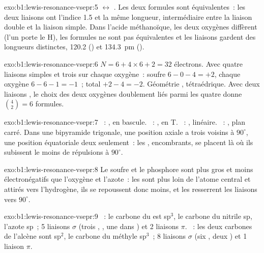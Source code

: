 \begin{solution}{exo:b1:lewis-resonance-vsepr:5}
$\leftrightarrow$
.
Les deux formules sont équivalentes~: les deux liaisons  ont
l'indice 1.5 et la même longueur, intermédiaire entre la liaison double
et la liaison simple. Dans l'acide méthanoïque, les deux oxygènes
diffèrent (l'un porte le H), les formules ne sont pas équivalentes et
les liaisons gardent des longueurs distinctes, 120.2 () et
\qty{134.3}{pm} ().
\end{solution}

\begin{solution}{exo:b1:lewis-resonance-vsepr:6}
$N = 6 + 4 \times 6 + 2 = 32$ électrons. Avec quatre liaisons simples et
trois  sur chaque oxygène~: soufre $6 - 0 - 4 = +2$,
chaque oxygène $6 - 6 - 1 = -1$~; total $+2 - 4 = -2$. Géométrie
, tétraédrique. Avec deux liaisons , le choix des deux
oxygènes doublement liés parmi les quatre donne $\binom{4}{2} = 6$ formules.
\end{solution}

\begin{solution}{exo:b1:lewis-resonance-vsepr:7}
~: , en bascule. ~: , en T.
~: , linéaire. ~: , plan carré.
Dans une bipyramide trigonale, une position axiale a trois voisins à
$90^\circ$, une position équatoriale deux seulement~: les , encombrants, se placent là où ils subissent le moins de
répulsions à $90^\circ$.
\end{solution}

\begin{solution}{exo:b1:lewis-resonance-vsepr:8}
Le soufre et le phosphore sont plus gros et moins électronégatifs que
l'oxygène et l'azote~: les  sont plus loin de l'atome
central et attirés vers l'hydrogène, ils se repoussent donc moins, et
les  resserrent les liaisons vers $90^\circ$.
\end{solution}

\begin{solution}{exo:b1:lewis-resonance-vsepr:9}
~: le carbone du  est sp$^3$, le carbone du nitrile
sp, l'azote sp~; 5 liaisons $\sigma$ (trois , , une dans
) et 2 liaisons $\pi$. ~: les deux carbones de
l'alcène sont sp$^2$, le carbone du méthyle sp$^3$~; 8 liaisons $\sigma$
(six , deux ) et 1 liaison $\pi$.
\end{solution}

